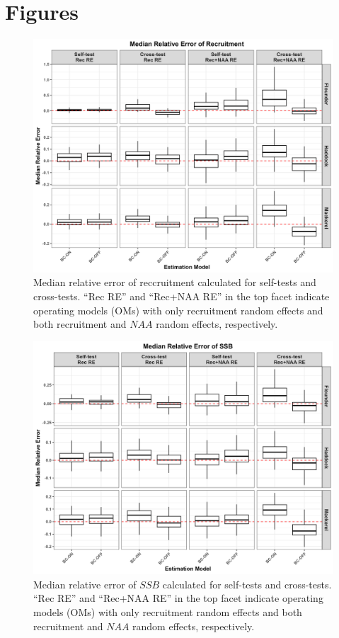 \documentclass[
  12pt,
]{article}
\begin{document}


\section{Figures}\label{figures}

\begin{figure}[H]
\centering
\includegraphics[width=\textwidth]{Revised_Figures&Tables/Median_Rec.PNG}
\caption{Median relative error of reccruitment calculated for self-tests and cross-tests. ``Rec RE'' and ``Rec+NAA RE'' in the top facet indicate operating models (OMs) with only recruitment random effects and both recruitment and $NAA$ random effects, respectively.}
\label{fig:Median_Rec}
\end{figure}

\begin{figure}[H]
\centering
\includegraphics[width=\textwidth]{Revised_Figures&Tables/Median_SSB.PNG}
\caption{Median relative error of $SSB$ calculated for self-tests and cross-tests. ``Rec RE'' and ``Rec+NAA RE'' in the top facet indicate operating models (OMs) with only recruitment random effects and both recruitment and $NAA$ random effects, respectively.}
\label{fig:Median_SSB}
\end{figure}
\end{document}
